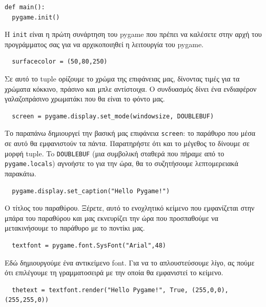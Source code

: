 \begin{verbatim}
def main():
  pygame.init()
\end{verbatim}

H {\tt init} είναι η πρώτη συνάρτηση του pygame που πρέπει να καλέσετε στην αρχή του προγράμματος σας για να αρχικοποιηθεί η λειτουργία του pygame.

\begin{verbatim}
  surfacecolor = (50,80,250)
\end{verbatim}

Σε αυτό το tuple ορίζουμε το χρώμα της επιφάνειας μας, δίνοντας τιμές για τα χρώματα κόκκινο, πράσινο και μπλε αντίστοιχα. Ο συνδυασμός δίνει ένα ενδιαφέρον γαλαζοπράσινο χρωματάκι που θα είναι το φόντο μας.

\begin{verbatim}
  screen = pygame.display.set_mode(windowsize, DOUBLEBUF)
\end{verbatim}

Το παραπάνω δημιουργεί την βασική μας επιφάνεια {\tt screen}: το παράθυρο που μέσα σε αυτό θα εμφανιστούν τα πάντα. Παρατηρήστε ότι και το μέγεθος το δίνουμε σε μορφή tuple. To {\tt DOUBLEBUF} (μια συμβολική σταθερά που πήραμε από το {\tt pygame.locals}) αγνοήστε το για την ώρα, θα το συζητήσουμε λεπτομερειακά παρακάτω.

\begin{verbatim}
  pygame.display.set_caption("Hello Pygame!")
\end{verbatim}

Ο τίτλος του παραθύρου. Ξέρετε, αυτό το ενοχλητικό κείμενο που εμφανίζεται στην μπάρα του παραθύρου και μας εκνευρίζει την ώρα που προσπαθούμε να μετακινήσουμε το παράθυρο με το ποντίκι μας.

\begin{verbatim}
  textfont = pygame.font.SysFont("Arial",48)
\end{verbatim}

Εδώ δημιουργούμε ένα αντικείμενο font. Για να το απλουστεύσουμε λίγο, ας πούμε ότι επιλέγουμε τη γραμματοσειρά με την οποία θα εμφανιστεί το κείμενο.

\begin{verbatim}
  thetext = textfont.render("Hello Pygame!", True, (255,0,0),(255,255,0))
\end{verbatim}

